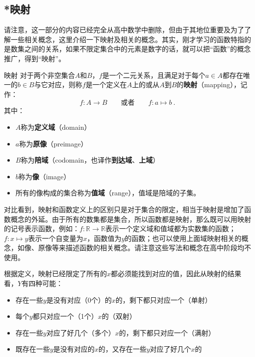 \subsection{*映射}

请注意，这一部分的内容已经完全从高中数学中删除，但由于其地位重要及为了了解一些相关概念，这里介绍一下映射及相关的概念。其实，刚才学习的函数特指的是数集之间的关系，如果不限定集合中的元素是数字的话，就可以把“函数”的概念推广，得到“映射”。

\begin{definition}{映射}
对于两个非空集合$A$和$B$，$f$是一个二元关系，且满足对于每个$a\in A$都存在唯一的$b\in B$与它对应，则称$f$是一个定义在$A$上的或从$A$到$B$的\textbf{映射}（mapping），记作：
\begin{equation}
f:A\to B\qquad\text{或者}\qquad f:a\mapsto b~.
\end{equation}
其中：
\begin{itemize}
\item $A$称为\textbf{定义域}（domain）
\item $a$称为\textbf{原像}（preimage）
\item $B$称为\textbf{陪域}（codomain，也译作\textbf{到达域}、\textbf{上域}）
\item $b$称为\textbf{像}（image）
\item 所有的像构成的集合称为\textbf{值域}（range），值域是陪域的子集。
\end{itemize}
\end{definition}

对比看到，映射和函数定义上的区别只是对于集合的限定，相当于映射是增加了函数概念的外延。由于所有的数集都是集合，所以函数都是映射，那么既可以用映射的记号表示函数，例如：$f: \mathbb R \to \mathbb R$表示一个定义域和值域都为实数集的函数；$f:x \mapsto y$表示一个自变量为$x$，函数值为$y$的函数；也可以使用上面域映射相关的概念，如像、原像等来描述函数的相关概念。请注意这些写法和概念在高中阶段均不使用。

根据定义，映射已经限定了所有的$x$都必须能找到对应的值，因此从映射的结果看，$Y$有四种可能：
\begin{itemize}
\item 存在一些$y$是没有对应（0个）的$x$的，剩下都只对应一个（单射）
\item 每个$y$都只对应一个（1个）$x$的（双射）
\item 存在一些$y$对应了好几个（多个）$x$的，剩下都只对应一个（满射）
\item 既存在一些$y$是没有对应的$x$的，又存在一些$y$对应了好几个$x$的
\end{itemize}

